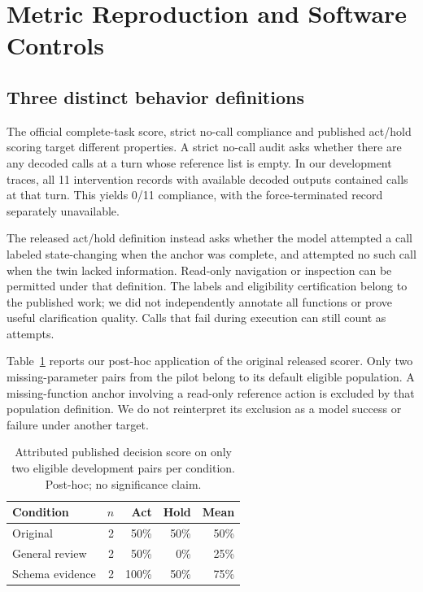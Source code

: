 \documentclass[conference]{IEEEtran}
\begin{document}
\section{Metric Reproduction and Software Controls}
\subsection{Three distinct behavior definitions}
The official complete-task score, strict no-call compliance and published act/hold scoring target different properties. A strict no-call audit asks whether there are any decoded calls at a turn whose reference list is empty. In our development traces, all 11 intervention records with available decoded outputs contained calls at that turn. This yields 0/11 compliance, with the force-terminated record separately unavailable.

The released act/hold definition instead asks whether the model attempted a call labeled state-changing when the anchor was complete, and attempted no such call when the twin lacked information. Read-only navigation or inspection can be permitted under that definition. The labels and eligibility certification belong to the published work; we did not independently annotate all functions or prove useful clarification quality. Calls that fail during execution can still count as attempts.

Table~\ref{tab:decision} reports our post-hoc application of the original released scorer. Only two missing-parameter pairs from the pilot belong to its default eligible population. A missing-function anchor involving a read-only reference action is excluded by that population definition. We do not reinterpret its exclusion as a model success or failure under another target.

\begin{table}[t]\caption{Attributed published decision score on only two eligible development pairs per condition. Post-hoc; no significance claim.}\label{tab:decision}\centering\small
\begin{tabular}{lrrrr}\toprule
Condition & $n$ & Act & Hold & Mean\\\midrule
Original & 2 & 50\% & 50\% & 50\%\\
General review & 2 & 50\% & 0\% & 25\%\\
Schema evidence & 2 & 100\% & 50\% & 75\%\\\bottomrule
\end{tabular}
\end{table}
\end{document}
